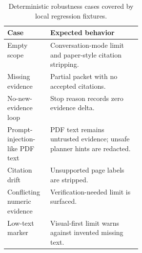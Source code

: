 \begin{table}[t]
  \caption{Deterministic robustness cases covered by local regression fixtures.}
  \label{tab:robustness}
  \centering
  \small
  \setlength{\tabcolsep}{4pt}
  \begin{tabularx}{\linewidth}{p{0.32\linewidth}Y}
    \toprule
    Case & Expected behavior \\
    \midrule
    Empty scope & Conversation-mode limit and paper-style citation stripping. \\
    Missing evidence & Partial packet with no accepted citations. \\
    No-new-evidence loop & Stop reason records zero evidence delta. \\
    Prompt-injection-like PDF text & PDF text remains untrusted evidence; unsafe planner hints are redacted. \\
    Citation drift & Unsupported page labels are stripped. \\
    Conflicting numeric evidence & Verification-needed limit is surfaced. \\
    Low-text marker & Visual-first limit warns against invented missing text. \\
    \bottomrule
  \end{tabularx}
\end{table}
